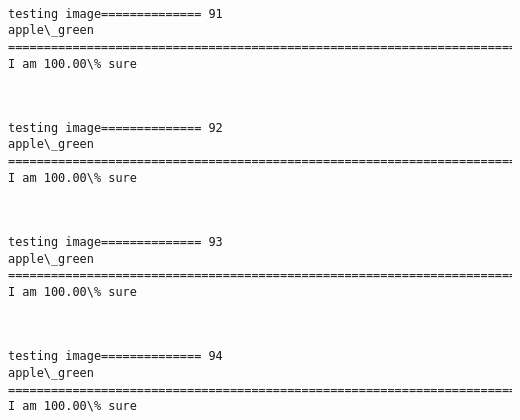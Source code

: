 \documentclass[11pt]{article}
\begin{document}
    \begin{center}
    \end{center}
    { \hspace*{\fill} \\}
    
    \begin{Verbatim}[commandchars=\\\{\}]
testing image============== 91
apple\_green
============================================================================
I am 100.00\% sure

    \end{Verbatim}

    \begin{center}
    \end{center}
    { \hspace*{\fill} \\}
    
    \begin{Verbatim}[commandchars=\\\{\}]
testing image============== 92
apple\_green
============================================================================
I am 100.00\% sure

    \end{Verbatim}

    \begin{center}
    \end{center}
    { \hspace*{\fill} \\}
    
    \begin{Verbatim}[commandchars=\\\{\}]
testing image============== 93
apple\_green
============================================================================
I am 100.00\% sure

    \end{Verbatim}

    \begin{center}
    \end{center}
    { \hspace*{\fill} \\}
    
    \begin{Verbatim}[commandchars=\\\{\}]
testing image============== 94
apple\_green
============================================================================
I am 100.00\% sure

    \end{Verbatim}
\end{document}
